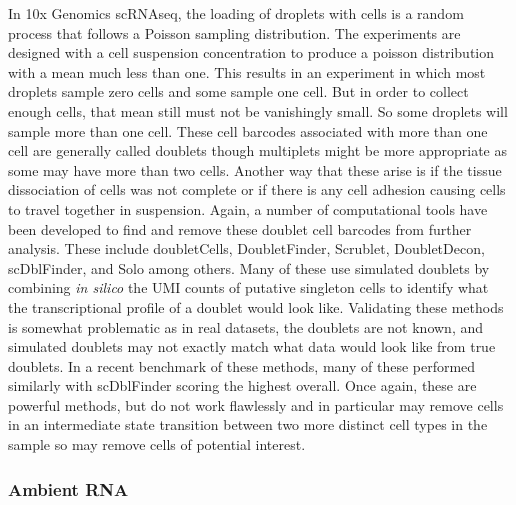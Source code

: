 \par{
In 10x Genomics scRNAseq, the loading of droplets with cells is a random process that follows a Poisson sampling distribution. The experiments are designed with a cell suspension concentration to produce a poisson distribution with a mean much less than one. This results in an experiment in which most droplets sample zero cells and some sample one cell. But in order to collect enough cells, that mean still must not be vanishingly small. So some droplets will sample more than one cell. These cell barcodes associated with more than one cell are generally called doublets though multiplets might be more appropriate as some may have more than two cells. Another way that these arise is if the tissue dissociation of cells was not complete or if there is any cell adhesion causing cells to travel together in suspension. Again, a number of computational tools have been developed to find and remove these doublet cell barcodes from further analysis. These include doubletCells\cite{doubletCells}, DoubletFinder\cite{doubletfinder}, Scrublet\cite{scrublet}, DoubletDecon\cite{doubletdecon}, scDblFinder\cite{scDblFinder}, and Solo\cite{solo} among others. Many of these use simulated doublets by combining \textit{in silico} the UMI counts of putative singleton cells to identify what the transcriptional profile of a doublet would look like. Validating these methods is somewhat problematic as in real datasets, the doublets are not known, and simulated doublets may not exactly match what data would look like from true doublets. In a recent benchmark of these methods, many of these performed similarly with scDblFinder scoring the highest overall\cite{doubletbench}. Once again, these are powerful methods, but do not work flawlessly and in particular may remove cells in an intermediate state transition between two more distinct cell types in the sample so may remove cells of potential interest.
}


\subsubsection{Ambient RNA}

